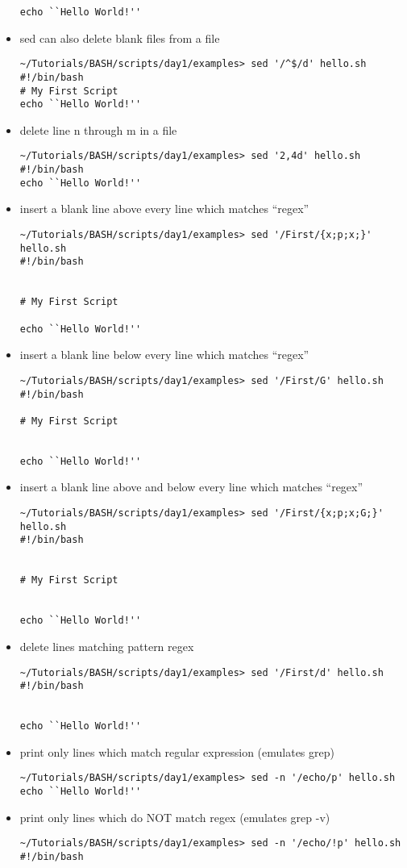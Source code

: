 \documentclass[10pt,t]{beamer}
\begin{document}
\begin{frame}
\begin{itemize}
\begin{lstlisting}[style=LINUX]
echo ``Hello World!''
      \end{lstlisting}
    \item sed can also delete blank files from a file
      \begin{lstlisting}[style=LINUX]
~/Tutorials/BASH/scripts/day1/examples> sed '/^$/d' hello.sh 
#!/bin/bash
# My First Script
echo ``Hello World!''
      \end{lstlisting}
    \item delete line n through m in a file
      \begin{lstlisting}[style=LINUX]
~/Tutorials/BASH/scripts/day1/examples> sed '2,4d' hello.sh 
#!/bin/bash
echo ``Hello World!''
      \end{lstlisting}
      \framebreak
      \item insert a blank line above every line which matches ``regex''
        \begin{lstlisting}[style=LINUX]
~/Tutorials/BASH/scripts/day1/examples> sed '/First/{x;p;x;}' hello.sh 
#!/bin/bash


# My First Script

echo ``Hello World!''
        \end{lstlisting}
      \item insert a blank line below every line which matches ``regex''
        \begin{lstlisting}[style=LINUX]
~/Tutorials/BASH/scripts/day1/examples> sed '/First/G' hello.sh 
#!/bin/bash

# My First Script


echo ``Hello World!''
        \end{lstlisting}
      \item insert a blank line above and below every line which matches ``regex''
        \begin{lstlisting}[style=LINUX]
~/Tutorials/BASH/scripts/day1/examples> sed '/First/{x;p;x;G;}' hello.sh 
#!/bin/bash


# My First Script


echo ``Hello World!''
        \end{lstlisting}
        \framebreak
    \item delete lines matching pattern regex
      \begin{lstlisting}[style=LINUX]
~/Tutorials/BASH/scripts/day1/examples> sed '/First/d' hello.sh 
#!/bin/bash


echo ``Hello World!''
      \end{lstlisting}
    \item print only lines which match regular expression (emulates grep)
      \begin{lstlisting}[style=LINUX]
~/Tutorials/BASH/scripts/day1/examples> sed -n '/echo/p' hello.sh
echo ``Hello World!''
      \end{lstlisting}
    \item print only lines which do NOT match regex (emulates grep -v)
      \begin{lstlisting}[style=LINUX]
~/Tutorials/BASH/scripts/day1/examples> sed -n '/echo/!p' hello.sh
#!/bin/bash


\end{lstlisting}
\end{itemize}
\end{frame}
\end{document}
